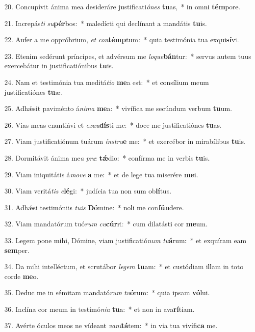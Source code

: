 20. Concupívit ánima mea desideráre justificati\textit{ó}\textit{nes} \textbf{tu}as,~*  in omni \textbf{tém}pore.\

21. Increpás\textit{ti} \textit{su}\textbf{pér}bos:~*  maledícti qui declínant a mandátis \textbf{tu}is.\

22. Aufer a me oppróbrium, \textit{et} \textit{con}\textbf{témp}tum:~*  quia testimónia tua exqui\textbf{sí}vi.\

23. Etenim sedérunt príncipes, et advérsum me \textit{lo}\textit{que}\textbf{bán}tur:~*  servus autem tuus exercebátur in justificatiónibus \textbf{tu}is.\

24. Nam et testimónia tua meditá\textit{ti}\textit{o} \textbf{me}a est:~*  et consílium meum justificatiónes \textbf{tu}æ.\

25. Adhǽsit paviménto á\textit{ni}\textit{ma} \textbf{me}a:~*  vivífica me secúndum verbum \textbf{tu}um.\

26. Vias meas enuntiávi et \textit{ex}\textit{au}\textbf{dís}ti me:~*  doce me justificatiónes \textbf{tu}as.\

27. Viam justificatiónum tuárum \textit{ín}\textit{stru}\textbf{e} me:~*  et exercébor in mirabílibus \textbf{tu}is.\

28. Dormitávit ánima me\textit{a} \textit{præ} \textbf{tǽ}dio:~*  confírma me in verbis \textbf{tu}is.\

29. Viam iniquitátis á\textit{mo}\textit{ve} \textbf{a} me:~*  et de lege tua miserére \textbf{me}i.\

30. Viam veritá\textit{tis} \textit{e}\textbf{lé}gi:~*  judícia tua non sum ob\textbf{lí}tus.\

31. Adhǽsi testimóniis \textit{tu}\textit{is} \textbf{Dó}mine:~*  noli me con\textbf{fún}dere.\

32. Viam mandatórum tuó\textit{rum} \textit{cu}\textbf{cúr}ri:~*  cum dilatásti cor \textbf{me}um.\

33. Legem pone mihi, Dómine, viam justificatió\textit{num} \textit{tu}\textbf{á}rum:~*  et exquíram eam \textbf{sem}per.\

34. Da mihi intelléctum, et scrutábor \textit{le}\textit{gem} \textbf{tu}am:~*  et custódiam illam in toto corde \textbf{me}o.\

35. Deduc me in sémitam mandató\textit{rum} \textit{tu}\textbf{ó}rum:~*  quia ipsam \textbf{vó}lui.\

36. Inclína cor meum in testimó\textit{ni}\textit{a} \textbf{tu}a:~*  et non in ava\textbf{rí}tiam.\

37. Avérte óculos meos ne vídeant \textit{va}\textit{ni}\textbf{tá}tem:~*  in via tua vivífi\textbf{ca} me.\


